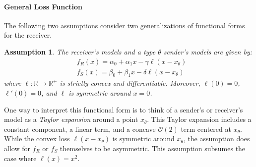 \documentclass[11pt,dvipsnames]{article}
\newtheorem{assumption}{Assumption}
\begin{document}
\begin{appendix}
\paragraph{General Loss Function}
The following two assumptions consider two generalizations of functional forms for the receiver.
\begin{assumption}
The receiver's models and a type $\theta$ sender's models are given by:
\begin{align}
&f_R(x) = \alpha_0+\alpha_1 x-\gamma \ell(x-x_\theta) 
\label{eq:generalfunctionrec}	
\\
&f_S(x) = \beta_0+\beta_1x-\delta \ell(x-x_\theta)
\label{eq:generalfunctionsend}	
\end{align}
where $\ell: \mathbb{R} \to \mathbb{R}^+$ is strictly convex and differentiable. Moreover, $\ell(0) = 0$, $\ell'(0) = 0$, and $\ell$ is symmetric around $x=0$.
\label{assfunction1}
\end{assumption}
One way to interpret this functional form is to think of a sender's or receiver's model as a \emph{Taylor expansion} around a point $x_\theta$.
This Taylor expansion includes a constant component, a linear term, and a concave $\mathcal{O}(2)$ term centered at $x_\theta$.
While the convex loss $\ell(x-x_\theta)$ is symmetric around $x_\theta$, the assumption does allow for $f_R$ or $f_S$ themselves to be asymmetric.
This assumption subsumes the case where $\ell(x) = x^2$.


\end{appendix}
\end{document}
